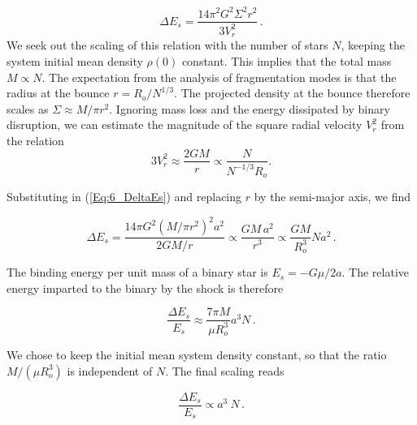 \begin{equation}
\label{Eq:6_DeltaEs}
\Delta E_s = \frac{14 \pi^2 G^2 \Sigma^2 r^2}{3 V_r^2}\, .
\end{equation}
We seek out the scaling of this relation with the number of stars $N$, keeping the system initial mean density $\rho(0)$ constant. This implies that the total mass $M \propto N$.  The expectation from the analysis of fragmentation modes is that the radius at the bounce $r = R_o / N^{1/3}$. The projected density at the bounce therefore scales as $\Sigma \approx M / \pi r^2 $. Ignoring mass loss and the energy dissipated by binary disruption, we can estimate the magnitude of the square radial velocity $V_r^2$ from the relation 
\begin{equation}
3 V_r^2 \approx \frac{2G M}{r} \propto \frac{N}{N^{-1/3} R_o}.
\end{equation}

Substituting in (\ref{Eq:6_DeltaEs}) and replacing $r$ by the semi-major axis, we find 

\begin{equation}
\Delta E_s =  \frac{14\pi G^2 ( M / \pi r^2 )^2 a^2}{ 2GM / r } \propto \frac{G M \, a^2}{r^3} \propto \frac{GM}{R_o^3} N a^2\, .
\end{equation}

The binding energy per unit mass of a binary star is $E_s = - G \mu / 2 a $. The relative energy imparted to the binary by the shock is therefore 

\begin{equation}
\frac{\Delta E_s }{E_s} \approx \frac{7\pi M}{\mu R_o^3} a^3 N    \, . 
\end{equation}

We chose to keep the initial mean system density constant, so that the ratio $ M/( \mu R_o^3)$ is independent of $N$. The final scaling reads  
  
\begin{equation}
\frac{\Delta E_s}{E_s}  \propto a^3 ~ N \, .
\end{equation}

